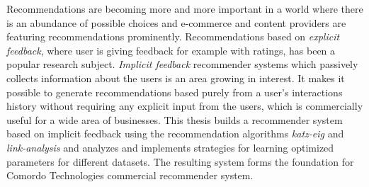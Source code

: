 
Recommendations are becoming more and more important in a world where there is an abundance of possible choices and e-commerce and content providers are featuring recommendations prominently. Recommendations based on \textit{explicit feedback}, where user is giving feedback for example with ratings, has been a popular research subject. \textit{Implicit feedback} recommender systems which passively collects information about the users is an area growing in interest. It makes it possible to generate recommendations based purely from a user's interactions history without requiring any explicit input from the users, which is commercially useful for a wide area of businesses. This thesis builds a recommender system based on implicit feedback using the recommendation algorithms \textit{katz-eig} and \textit{link-analysis} and analyzes and implements strategies for learning optimized parameters for different datasets. The resulting system forms the foundation for Comordo Technologies commercial recommender system.

